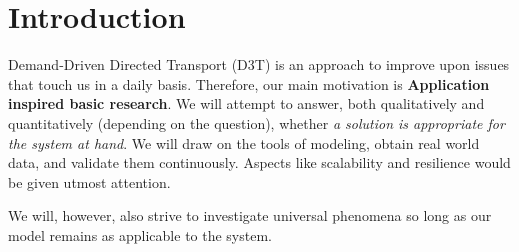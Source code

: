\section*{Introduction}
Demand-Driven Directed Transport (D3T) is an approach to improve upon issues that touch us in a daily basis. Therefore, our main motivation is
{\bf Application inspired basic research}. We will attempt to answer, both qualitatively and quantitatively (depending on the question), whether 
\emph{a solution is appropriate for the system at hand}. We will draw on the tools of modeling, obtain real world data, and validate them continuously. 
Aspects like scalability and resilience would be given utmost attention. 

We will, however, also strive to investigate universal phenomena so long as our model remains as applicable to the system. 